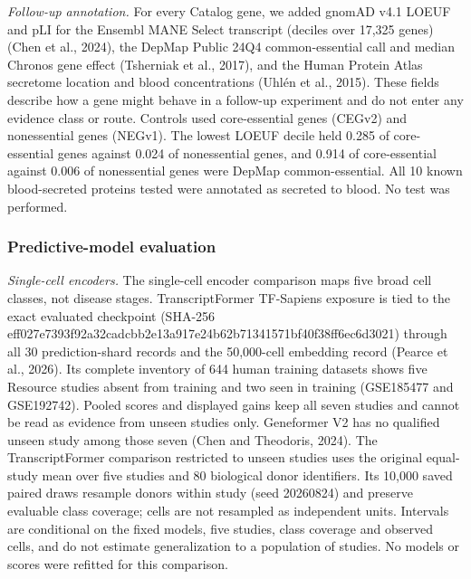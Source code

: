 \emph{Follow-up annotation.} For every Catalog gene, we added gnomAD v4.1 LOEUF and pLI for the Ensembl MANE Select transcript (deciles over 17,325 genes) (Chen et al., 2024), the DepMap Public 24Q4 common-essential call and median Chronos gene effect (Tsherniak et al., 2017), and the Human Protein Atlas secretome location and blood concentrations (Uhlén et al., 2015). These fields describe how a gene might behave in a follow-up experiment and do not enter any evidence class or route. Controls used core-essential genes (CEGv2) and nonessential genes (NEGv1). The lowest LOEUF decile held 0.285 of core-essential genes against 0.024 of nonessential genes, and 0.914 of core-essential against 0.006 of nonessential genes were DepMap common-essential. All 10 known blood-secreted proteins tested were annotated as secreted to blood. No test was performed.

\subsubsection{Predictive-model evaluation}\label{predictive-model-evaluation}

\emph{Single-cell encoders.} The single-cell encoder comparison maps five broad cell classes, not disease stages. TranscriptFormer TF-Sapiens exposure is tied to the exact evaluated checkpoint (SHA-256 eff027e7393f92a32cadcbb2e13a917e24b62b71341571bf40f38ff6ec6d3021) through all 30 prediction-shard records and the 50,000-cell embedding record (Pearce et al., 2026). Its complete inventory of 644 human training datasets shows five Resource studies absent from training and two seen in training (GSE185477 and GSE192742). Pooled scores and displayed gains keep all seven studies and cannot be read as evidence from unseen studies only. Geneformer V2 has no qualified unseen study among those seven (Chen and Theodoris, 2024). The TranscriptFormer comparison restricted to unseen studies uses the original equal-study mean over five studies and 80 biological donor identifiers. Its 10,000 saved paired draws resample donors within study (seed 20260824) and preserve evaluable class coverage; cells are not resampled as independent units. Intervals are conditional on the fixed models, five studies, class coverage and observed cells, and do not estimate generalization to a population of studies. No models or scores were refitted for this comparison.

